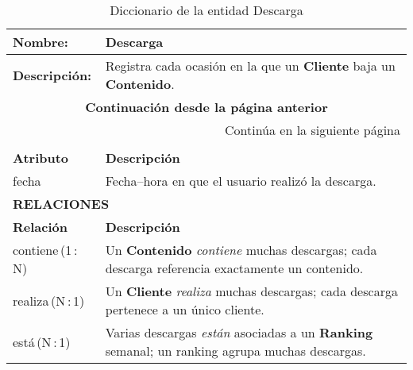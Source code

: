 \renewcommand{\arraystretch}{1.3}
\begin{longtable}{|p{3.5cm}|p{10cm}|}
\caption{Diccionario de la entidad Descarga}
\label{tab:diccionarioDescarga} \\ 
\hline
\textbf{Nombre:} & Descarga \\
\hline
\textbf{Descripción:} & 
Registra cada ocasión en la que un \textbf{Cliente} baja un
\textbf{Contenido}. \\ \hline
\endfirsthead

\multicolumn{2}{c}{\textbf{Continuación desde la página anterior}} \\ 
\endhead

\hline \multicolumn{2}{r}{{Continúa en la siguiente página}} \\ 
\endfoot

\hline
\endlastfoot

\multicolumn{2}{|p{13.5cm}|}{\textbf{ATRIBUTOS}} \\ \hline
\textbf{Atributo} & \textbf{Descripción} \\ \hline
fecha        & Fecha–hora en que el usuario realizó la descarga. \\ \hline

\multicolumn{2}{|p{13.5cm}|}{\textbf{RELACIONES}} \\ \hline
\textbf{Relación} & \textbf{Descripción} \\ \hline
contiene\,(1\,:\,N) & Un \textbf{Contenido} \textit{contiene} muchas descargas;  
cada descarga referencia exactamente un contenido. \\ \hline
realiza\,(N\,:\,1) & Un \textbf{Cliente} \textit{realiza} muchas descargas;  
cada descarga pertenece a un único cliente. \\ \hline
está\,(N\,:\,1) & Varias descargas \textit{están} asociadas a un  
\textbf{Ranking} semanal; un ranking agrupa muchas descargas. \\ \hline
\end{longtable}